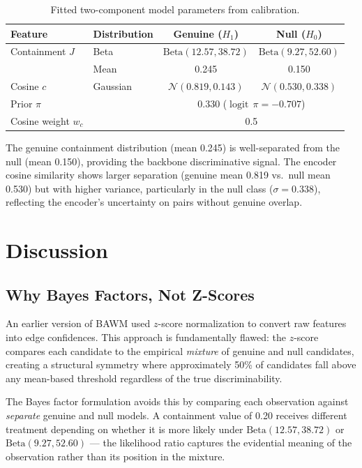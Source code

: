 \documentclass[11pt,a4paper]{article}
\DeclareMathOperator{\logit}{logit}
\begin{document}
\begin{table}[ht]
  \centering
  \caption{Fitted two-component model parameters from calibration.}
  \label{tab:distributions}
  \begin{tabular}{llcc}
    \toprule
    Feature & Distribution & Genuine ($H_1$) & Null ($H_0$) \\
    \midrule
    Containment $J$ & Beta & $\mathrm{Beta}(12.57, 38.72)$ & $\mathrm{Beta}(9.27, 52.60)$ \\
    & Mean & 0.245 & 0.150 \\
    \midrule
    Cosine $c$ & Gaussian & $\mathcal{N}(0.819, 0.143)$ & $\mathcal{N}(0.530, 0.338)$ \\
    \midrule
    Prior $\pi$ & & \multicolumn{2}{c}{0.330 ($\logit\, \pi = -0.707$)} \\
    Cosine weight $w_c$ & & \multicolumn{2}{c}{0.5} \\
    \bottomrule
  \end{tabular}
\end{table}

The genuine containment distribution (mean 0.245) is well-separated
from the null (mean 0.150), providing the backbone discriminative
signal.  The encoder cosine similarity shows larger separation
(genuine mean 0.819 vs.\ null mean 0.530) but with higher variance,
particularly in the null class ($\sigma = 0.338$), reflecting the
encoder's uncertainty on pairs without genuine overlap.


\section{Discussion}
\label{sec:discussion}

\subsection{Why Bayes Factors, Not Z-Scores}

An earlier version of BAWM used $z$-score normalization to convert
raw features into edge confidences.  This approach is fundamentally
flawed: the $z$-score compares each candidate to the empirical
\emph{mixture} of genuine and null candidates, creating a structural
symmetry where approximately 50\% of candidates fall above any
mean-based threshold regardless of the true discriminability.

The Bayes factor formulation avoids this by comparing each observation
against \emph{separate} genuine and null models.  A containment value
of 0.20 receives different treatment depending on whether it is more
likely under $\mathrm{Beta}(12.57, 38.72)$ or
$\mathrm{Beta}(9.27, 52.60)$ --- the likelihood ratio captures the
evidential meaning of the observation rather than its position in the
mixture.
\end{document}
